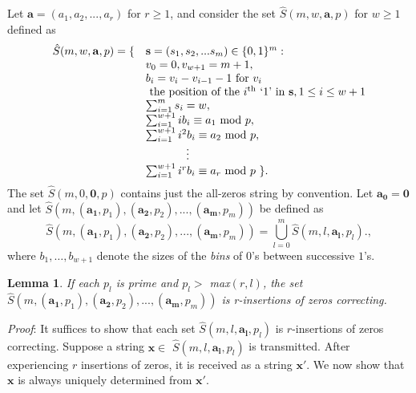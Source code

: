 \documentclass[12pt]{article} \pagestyle{plain} \topmargin
\newtheorem{lemma}{Lemma}
\begin{document}
Let $\mathbf{a}=\left(a_1,a_2,...,a_r\right)$ for $r \geq 1$, and
consider the set $\hat{S}(m,w,\mathbf{a},p)$ for $w \geq 1$ defined
as
\begin{equation}\label{exten}\begin{array}{lll}\hat{S}(m,w,\mathbf{a},p) = \{ & \mathbf{s}=(s_1, s_2, ... s_m) \in
\{0,1\}^m:\\
{} & v_0=0, v_{w+1}=m+1,\\{} & b_i=v_i-v_{i-1}-1 \text{ for } v_i \\ {} &  \text{ the position of the } i^{\text{th} }\text{ `1' in } \mathbf{s},1 \leq i \leq w+1\\
{} & \sum_{i=1}^m s_i = w,\\
{} & \sum_{i=1}^{w+1} ib_i \equiv a_1 \text{ mod } p,\\ {} &
\sum_{i=1}^{w+1} i^2b_i
\equiv a_2 \text{ mod } p,\\
{} & \hspace{0.5in}\vdots\\ {} & \sum_{i=1}^{w+1} i^rb_i \equiv a_r
\text{ mod } p~\}.\end{array}\end{equation} The set
$\hat{S}(m,0,\mathbf{0},p)$ contains just the all-zeros string by
convention. Let $\mathbf{a_0} = \mathbf{0}$ and let
\newline \noindent $\hat{S}\left(m,(\mathbf{a_1},p_1),(\mathbf{a_2},p_2),...,(\mathbf{a_m},p_m)\right)$
be defined as
\begin{equation}\label{union}\hat{S}\left(m,(\mathbf{a_1},p_1),(\mathbf{a_2},p_2),...,(\mathbf{a_m},p_m)\right)=
\bigcup_{l=0}^{m} \hat{S}(m,l,\mathbf{a_l},p_l).,\end{equation}
where $b_1, \ldots, b_{w+1}$ denote the sizes of the {\em bins} of
$0$'s between successive $1$'s.

\begin{lemma}\label{multproof}\textit{If each $p_l$ is prime and $p_l >$
max$(r,l)$, the set
$\hat{S}\left(m,(\mathbf{a_1},p_1),(\mathbf{a_2},p_2),...,(\mathbf{a_m},p_m)\right)$
is r-insertions of zeros correcting.}\end{lemma}



\textit{Proof}: It suffices to show that each set
$\hat{S}(m,l,\mathbf{a_l},p_l)$ is $r$-insertions of zeros
correcting. Suppose a string $\mathbf{x} \in$
$\hat{S}(m,l,\mathbf{a_l},p_l)$ is transmitted. After experiencing
$r$ insertions of zeros, it is received as a string $\mathbf{x'}$.
We now show that $\mathbf{x}$ is always uniquely determined from
$\mathbf{x'}$.
\end{document}
